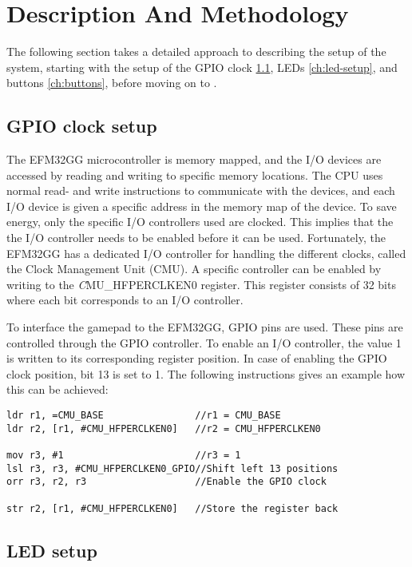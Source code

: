 \section{Description And Methodology}

The following section takes a detailed approach to describing the setup of the system, starting with the setup of the GPIO clock \ref{ch:initial_setup}, LEDs \ref{ch:led-setup}, and buttons \ref{ch:buttons}, before moving on to .


\subsection{GPIO clock setup} \label{ch:initial_setup}
The EFM32GG microcontroller is memory mapped, and the I/O devices are accessed by reading and writing to specific memory locations. The CPU uses normal read- and write instructions to communicate with the devices, and each I/O device is given a specific address in the memory map of the device. To save energy, only the specific I/O controllers used are clocked. This implies that the the I/O controller needs to be enabled before it can be used. Fortunately, the EFM32GG has a dedicated I/O controller for handling the different clocks, called the Clock Management Unit (CMU). A specific controller can be enabled by writing to the \emph CMU\_HFPERCLKEN0 register. This register consists of 32 bits where each bit corresponds to an I/O controller.

To interface the gamepad to the EFM32GG, GPIO pins are used. These pins are controlled through the GPIO controller. To enable an I/O controller, the value 1 is written to its corresponding register position. In case of enabling the GPIO clock position, bit 13 is set to 1. The following instructions gives an example how this can be achieved: 

\begin{lstlisting}
ldr r1, =CMU_BASE                //r1 = CMU_BASE
ldr r2, [r1, #CMU_HFPERCLKEN0]   //r2 = CMU_HFPERCLKEN0 

mov r3, #1                       //r3 = 1
lsl r3, r3, #CMU_HFPERCLKEN0_GPIO//Shift left 13 positions
orr r3, r2, r3                   //Enable the GPIO clock

str r2, [r1, #CMU_HFPERCLKEN0]   //Store the register back 
\end{lstlisting}

\subsection{LED setup}\label{led-setup}

